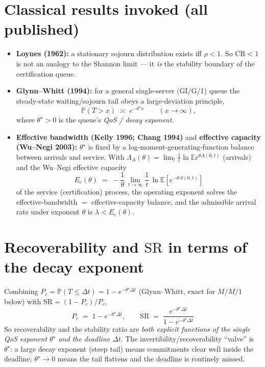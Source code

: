 \documentclass[11pt]{article}
\newcommand{\CR}{\mathrm{CR}}
\newcommand{\SR}{\mathrm{SR}}
\newcommand{\E}{\mathbb{E}}
\newcommand{\Prob}{\mathbb{P}}
\begin{document}
\section{Classical results invoked (all published)}
\begin{itemize}
\item \textbf{Loynes (1962):} a stationary sojourn distribution exists iff $\rho<1$. So $\CR<1$ is not an
analogy to the Shannon limit --- it \emph{is} the stability boundary of the certification queue.
\item \textbf{Glynn--Whitt (1994):} for a general single-server (GI/G/1) queue the steady-state
waiting/sojourn tail obeys a large-deviation principle,
\[
\Prob(T>x)\;\asymp\; e^{-\theta^\star x}\qquad(x\to\infty),
\]
where $\theta^\star>0$ is the queue's \emph{QoS / decay exponent}.
\item \textbf{Effective bandwidth (Kelly 1996; Chang 1994)} and \textbf{effective capacity (Wu--Negi 2003):}
$\theta^\star$ is fixed by a log-moment-generating-function balance between arrivals and service. With
$\Lambda_A(\theta)=\lim_t \tfrac1t\ln\E e^{\theta A(0,t)}$ (arrivals) and the Wu--Negi effective capacity
\[
E_c(\theta)\;=\;-\frac{1}{\theta}\,\lim_{t\to\infty}\frac1t\,\ln \E\!\left[e^{-\theta\,S(0,t)}\right]
\]
of the service (certification) process, the operating exponent solves the effective-bandwidth $=$
effective-capacity balance, and the admissible arrival rate under exponent $\theta$ is $\lambda<E_c(\theta)$.
\end{itemize}

\section{Recoverability and $\SR$ in terms of the decay exponent}
Combining $P_c=\Prob(T\le\Delta t)=1-e^{-\theta^\star\Delta t}$ (Glynn--Whitt, exact for $M/M/1$ below) with
$\SR=(1-P_c)/P_c$,
\begin{equation}
\boxed{\;P_c \;=\; 1-e^{-\theta^\star\Delta t},
\qquad
\SR \;=\; \frac{e^{-\theta^\star\Delta t}}{1-e^{-\theta^\star\Delta t}}\;}
\label{eq:srtheta}
\end{equation}
So recoverability and the stability ratio are \emph{both explicit functions of the single QoS exponent
$\theta^\star$ and the deadline $\Delta t$}. The invertibility/recoverability ``valve'' is $\theta^\star$:
a large decay exponent (steep tail) means commitments clear well inside the deadline; $\theta^\star\to0$
means the tail flattens and the deadline is routinely missed.
\end{document}
